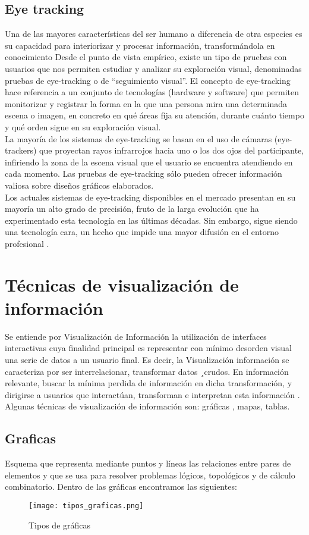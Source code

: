 \subsection{Eye tracking}
Una de las mayores características del ser humano a diferencia de otra especies es su capacidad para interiorizar y procesar información, transformándola en conocimiento
Desde el punto de vista empírico, existe un tipo de pruebas con usuarios que nos permiten estudiar y analizar su exploración visual, denominadas pruebas de eye-tracking o de “seguimiento visual”. El concepto de eye-tracking hace referencia a un conjunto de tecnologías (hardware y software) que permiten monitorizar y registrar la forma en la que una persona mira una determinada escena o imagen, en concreto en qué áreas fija su atención, durante cuánto tiempo y qué orden sigue en su exploración visual.\\
La mayoría de los sistemas de eye-tracking se basan en el uso de cámaras (eye-trackers) que proyectan rayos infrarrojos hacia uno o los dos ojos del participante, infiriendo la zona de la escena visual que el usuario se encuentra atendiendo en cada momento.
Las pruebas de eye-tracking sólo pueden ofrecer información valiosa sobre diseños gráficos elaborados.\\
Los actuales sistemas de eye-tracking disponibles en el mercado presentan en su mayoría un alto grado de precisión, fruto de la larga evolución que ha experimentado esta tecnología en las últimas décadas. Sin embargo, sigue siendo una tecnología cara, un hecho que impide una mayor difusión en el entorno profesional \cite{hassan2009informe}.
\section{Técnicas de visualización de información}
Se entiende por Visualización de Información la utilización de interfaces interactivas cuya finalidad principal es representar con mínimo desorden visual una serie de datos a un usuario final. Es decir, la Visualización información se caracteriza por ser interrelacionar, transformar datos ¸crudos. En información relevante, buscar la mínima perdida de información en dicha transformación, y dirigirse a usuarios que interactúan, transforman e interpretan esta información \cite{cordoba}.
Algunas técnicas de visualización de información son: gráficas , mapas, tablas.
\subsection{Graficas}
Esquema que representa mediante puntos y líneas las relaciones
entre pares de elementos y que se usa para resolver problemas lógicos, topológicos y de cálculo combinatorio. Dentro de las gráficas encontramos las siguientes:
\begin{figure}[H]
\centering
\texttt{[image: tipos\_graficas.png]}
\caption{Tipos de gráficas}
\label{fig:tipos}
\end{figure}

